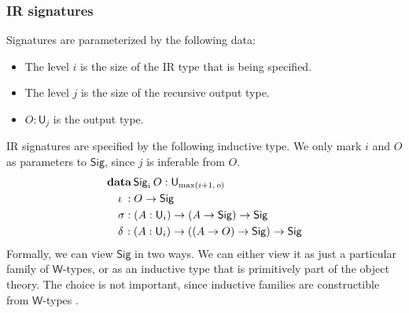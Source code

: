\documentclass[acmsmall,screen,review,anonymous]{acmart}
\newcommand{\msf}[1]{{\mathsf{#1}}}
\newcommand{\mbf}[1]{{\mathbf{#1}}}
\newcommand{\data}{\mbf{data}}
\newcommand{\U}{\msf{U}}
\newcommand{\Sig}{\msf{Sig}}
\begin{document}
\subsubsection{IR signatures}\label{sec:ir-signatures}
Signatures are parameterized by the following data:
\begin{itemize}
\item The level $i$ is the size of the IR type that is being specified.
\item The level $j$ is the size of the recursive output type.
\item $O : \U_j$ is the output type.
\end{itemize}
IR signatures are specified by the following inductive type. We only mark $i$ and $O$ as parameters to $\Sig$,
since $j$ is inferable from $O$.
\begin{alignat*}{4}
  &\data\, \Sig_i\,O : \U_{\max(i+1,\,o)}\\
  &\quad \iota\hspace{0.25em}  : O \to \Sig \\
  &\quad \sigma               : (A : \U_i) \to (A \to \Sig) \to \Sig \\
  &\quad \delta\hspace{0.1em} : (A : \U_i) \to ((A \to O) \to \Sig) \to \Sig
\end{alignat*}
Formally, we can view $\Sig$ in two ways. We can either view it as just a particular family of $\msf{W}$-types,
or as an inductive type that is primitively part of the object theory. The choice is not important, since inductive
families are constructible from $\msf{W}$-types \cite{whynotw}.
\end{document}

